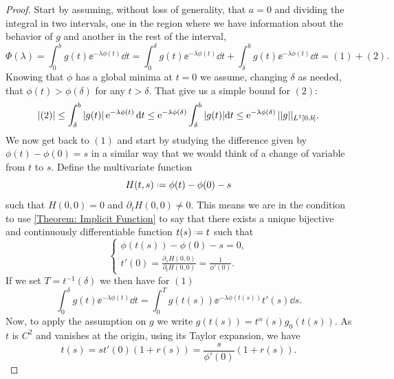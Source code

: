 \begin{proof}
	Start by assuming, without loss of generality, that $a=0$ and dividing the integral in two intervals, one in the region where we have information about the behavior of $g$ and another in the rest of the interval,
	\begin{equation}
		\Phi(\lambda) = \int_{0}^{b} g(t) \ee^{-\lambda \phi(t)} \dd t = \int_{0}^{\delta} g(t) \ee^{-\lambda \phi(t)} \dd t + \int_{\delta}^{b} g(t) \ee^{-\lambda \phi(t)} \dd t = (1) + (2).
	\end{equation}
	Knowing that $\phi$ has a global minima at $t = 0$ we assume, changing $\delta$ as needed, that $\phi(t) > \phi(\delta)$ for any $t > \delta$. That give us a simple bound for $(2)$:
	\begin{equation}
		|(2)| \leq \int_{\delta}^{b} |g(t)| \ee^{-\lambda \phi(t)} \dd t \leq \ee^{-\lambda \phi(\delta)} \int_{\delta}^{b} |g(t)| \dd t \leq \ee^{-\lambda \phi(\delta)} \normL{1}{g}{[0,b]}.
	\end{equation}
	We now get back to $(1)$ and start by studying the difference given by $\phi(t) - \phi(0) = s$ in a similar way that we would think of a change of variable from $t$ to $s$. Define the multivariate function
	\begin{equation}
		H(t,s) \deff \phi(t) - \phi(0) - s
	\end{equation} 
	such that $H(0,0) = 0$ and $\partial_t H(0,0) \neq 0$. This means we are in the condition to use \autoref{Theorem: Implicit Function} to say that there exists a unique bijective and continuously differentiable function $t(s) \deff t$ such that 
	\begin{equation}
		\begin{cases}
			\phi(t(s)) - \phi(0) - s = 0,	\\
			t'(0) = \frac{\partial_s H(0,0)}{\partial_t H(0,0)} = \frac{1}{\phi'(0)}.
		\end{cases}
	\end{equation}
	If we set $T = t^{-1}(\delta)$ we then have for $(1)$
	\begin{equation}
		\int_{0}^{\delta} g(t) \ee^{-\lambda \phi(t)} \dd t = \int_{0}^{T} g(t(s)) \ee^{-\lambda \phi(t(s))} t'(s) \dd s.
	\end{equation}
	Now, to apply the assumption on $g$ we write $g(t(s)) = t^\alpha(s) g_0(t(s))$. As $t$ is $C^2$ and vanishes at the origin, using its Taylor expansion, we have
	\begin{equation}
	t(s) = s t'(0) (1+r(s)) = \frac{s}{\phi'(0)}(1+r(s)).		
	\end{equation}

\end{proof}
